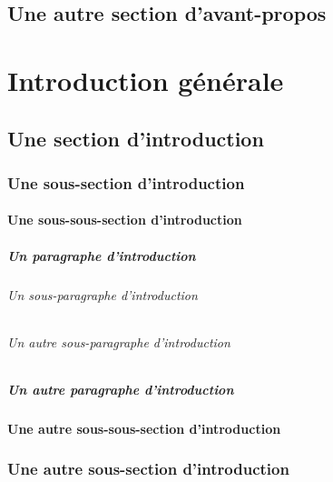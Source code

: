 \documentclass[12pt,space=onehalf,version=final]{yathesis}
\begin{document}
\section{Une autre section d'avant-propos}
\lipsum[30-35]
%
\tableofcontents[depth=chapter,name=Sommaire]
%
\listoftables
%
\listoffigures
%
%
\mainmatter
%
\chapter*{Introduction générale}
\lipsum[26]
\section{Une section d'introduction}
\lipsum[28]
\subsection{Une sous-section d'introduction}
\lipsum[29]
\subsubsection{Une sous-sous-section d'introduction}
\lipsum[30]
\paragraph{Un paragraphe d'introduction}
\lipsum[31]
\subparagraph{Un sous-paragraphe d'introduction}
\lipsum[32]
\subparagraph{Un autre sous-paragraphe d'introduction}
\lipsum[33]
\paragraph{Un autre paragraphe d'introduction}
\lipsum[34]
\subsubsection{Une autre sous-sous-section d'introduction}
\lipsum[35]
\subsection{Une autre sous-section d'introduction}
\lipsum[36]
\end{document}
